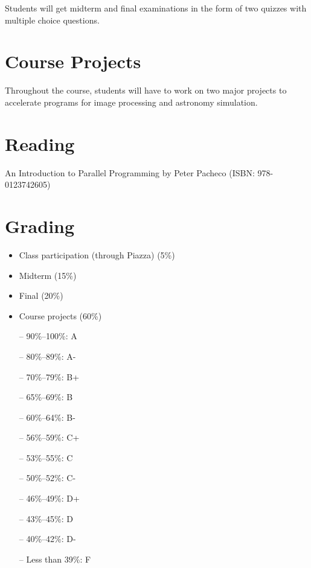 \documentclass[12pt,a4paper,oneside]{article}
\begin{document}
        Students will get midterm and final examinations in the form of two
        quizzes with multiple choice questions.

    \section{Course Projects}

        Throughout the course, students will have to work on two major
        projects to accelerate programs for image processing and astronomy
        simulation.

    \section{Reading}

        An Introduction to Parallel Programming by Peter Pacheco (ISBN:
        978-0123742605)

    \section{Grading}

        \begin{itemize}
            \item Class participation (through Piazza) (5\%)
            \item Midterm (15\%)
            \item Final (20\%)
            \item Course projects (60\%)
        \end{itemize}

        \begin{itemize} \itemsep-10pt \parskip0pt 
            \item[--] 90\%--100\%: A\\
            \item[--] 80\%--89\%: A-\\
            \item[--] 70\%--79\%: B+\\
            \item[--] 65\%--69\%: B\\
            \item[--] 60\%--64\%: B-\\
            \item[--] 56\%--59\%: C+\\
            \item[--] 53\%--55\%: C\\
            \item[--] 50\%--52\%: C-\\
            \item[--] 46\%--49\%: D+\\
            \item[--] 43\%--45\%: D\\
            \item[--] 40\%--42\%: D-\\
            \item[--] Less than 39\%: F
        \end{itemize}
\end{document}
